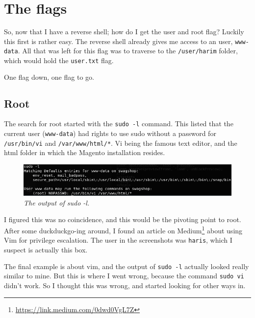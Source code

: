 \chapter{The flags}
\label{chap:flags}

So, now that I have a reverse shell; how do I get the user and root flag? Luckily this first is rather easy. The reverse shell already gives me access to an user, \verb|www-data|. All that was left for this flag was to traverse to the \verb|/user/harim| folder, which would hold the \verb|user.txt| flag.

\vspace{5mm}

One flag down, one flag to go.

\section{Root}

The search for root started with the \verb|sudo -l| command. This listed that the current user (\verb|www-data|) had rights to use sudo without a password for \verb|/usr/bin/vi| and \verb|/var/www/html/*|. Vi being the famous text editor, and the html folder in which the Magento installation resides.

\begin{figure}[H]
	\centering
	\captionsetup{justification=centering}
	\noindent \includegraphics[width=\textwidth]{figures/sudo-output.png}
	\caption{\emph{The output of sudo -l.}}
	\label{fig:sudo}
\end{figure}

I figured this was no coincidence, and this would be the pivoting point to root. After some duckduckgo-ing around, I found an article on Medium\footnote{\url{https://link.medium.com/0dwd0VgL7Z}} about using Vim for privilege escalation. The user in the screenshots was \verb|haris|, which I suspect is actually this box.

The final example is about vim, and the output of \verb|sudo -l| actually looked really similar to mine. But this is where I went wrong, because the command \verb|sudo vi| didn't work. So I thought this was wrong, and started looking for other ways in.

\vspace{5mm}

